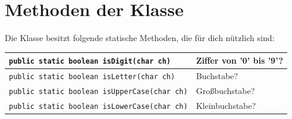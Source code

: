 \pagebreak

\section{Methoden der Klasse }

Die Klasse  besitzt folgende statische Methoden, die für
dich nützlich sind:

\medskip
\bgroup
\def\arraystretch{1.2}
\begin{tabularx}{\textwidth}{|p{85mm}|X|}
\hline
\texttt{public static boolean isDigit(char ch)} & 
Ziffer von '0' bis '9'?
\\ \hline
\texttt{public static boolean isLetter(char ch)} & 
Buchstabe?
\\ \hline
\texttt{public static boolean isUpperCase(char ch)} & 
Großbuchstabe?
\\ \hline
\texttt{public static boolean isLowerCase(char ch)} & 
Kleinbuchstabe?
\\ \hline
\end{tabularx}
\egroup

